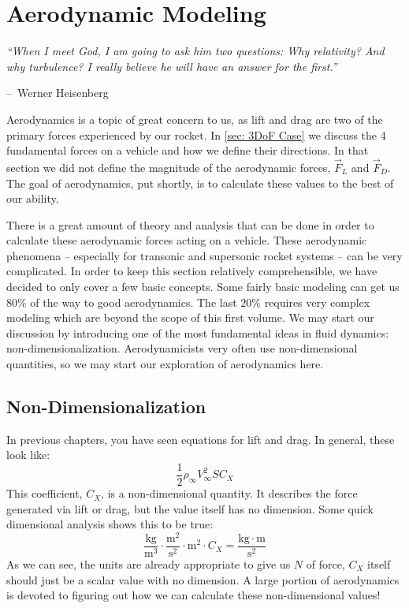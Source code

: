 \documentclass[10pt, openany, titlepage]{book}
\makeatletter
\theoremstyle{definition}
\let\oldautoref\autoref
\renewcommand{\autoref}[1]{%
  \begingroup
  \hypersetup{linkcolor=black}%
  \oldautoref{#1}%
  \endgroup
}
\newenvironment{chapquote}[2][2em]
  {\setlength{\@tempdima}{#1}%
   \def\chapquote@author{#2}%
   \parshape 1 \@tempdima \dimexpr\textwidth-2\@tempdima\relax%
   \itshape}
  {\par\normalfont\hfill--\ \chapquote@author\hspace*{\@tempdima}\par\bigskip}
\makeatother
\begin{document}
\newpage
\printendnotes[large]

\chapter{Aerodynamic Modeling}\label{sec: aerodynamics}
\begin{chapquote}{Werner Heisenberg}
``When I meet God, I am going to ask him two questions: Why relativity? And why turbulence? I really believe he will have an answer for the first.''
\end{chapquote}

Aerodynamics is a topic of great concern to us, as lift and drag are two of the primary forces experienced by our rocket. In \autoref{sec: 3DoF Case} we discuss the 4 fundamental forces on a vehicle and how we define their directions. In that section we did not define the magnitude of the aerodynamic forces, $\vec{F}_L$ and $\vec{F}_D$. The goal of aerodynamics, put shortly, is to calculate these values to the best of our ability.

There is a great amount of theory and analysis that can be done in order to calculate these aerodynamic forces acting on a vehicle. These aerodynamic phenomena -- especially for transonic and supersonic rocket systems -- can be very complicated. In order to keep this section relatively comprehensible, we have decided to only cover a few basic concepts. Some fairly basic modeling can get us $80\%$ of the way to good aerodynamics. The last $20\%$ requires very complex modeling which are beyond the scope of this first volume. We may start our discussion by introducing one of the most fundamental ideas in fluid dynamics: non-dimensionalization. Aerodynamicists very often use non-dimensional quantities, so we may start our exploration of aerodynamics here. 

\section{Non-Dimensionalization}

In previous chapters, you have seen equations for lift and drag. In general, these look like:
$$\frac{1}{2}\rho_{\infty}V^2_{\infty}SC_X$$
This coefficient, $C_X$, is a non-dimensional quantity. It describes the force generated via lift or drag, but the value itself has no dimension. Some quick dimensional analysis shows this to be true:
$$\frac{\text{kg}}{\mathrm{m^3}}\cdot\frac{\mathrm{m^2}}{\mathrm{s^2}}\cdot\mathrm{m^2}\cdot C_X=\frac{\mathrm{kg\cdot m}}{\mathrm{s^2}}$$
As we can see, the units are already appropriate to give us $N$ of force, $C_X$ itself should just be a scalar value with no dimension. A large portion of aerodynamics is devoted to figuring out how we can calculate these non-dimensional values!
\end{document}
